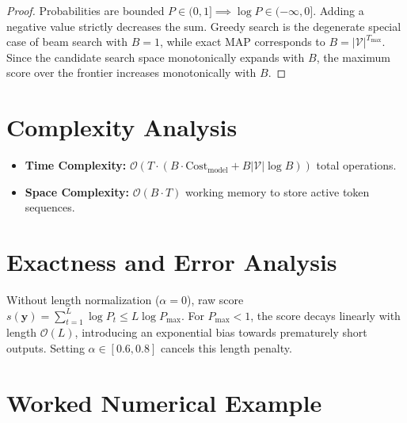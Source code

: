 \documentclass[11pt,a4paper]{article}
\theoremstyle{definition}
\begin{document}
\begin{proof}
Probabilities are bounded $P \in (0, 1] \implies \log P \in (-\infty, 0]$. Adding a negative value strictly decreases the sum. Greedy search is the degenerate special case of beam search with $B=1$, while exact MAP corresponds to $B = |\mathcal{V}|^{T_{\max}}$. Since the candidate search space monotonically expands with $B$, the maximum score over the frontier increases monotonically with $B$.
\end{proof}

\section{Complexity Analysis}

\begin{itemize}
    \item \textbf{Time Complexity:} $\mathcal{O}(T \cdot (B \cdot \text{Cost}_{\text{model}} + B |\mathcal{V}| \log B))$ total operations.
    \item \textbf{Space Complexity:} $\mathcal{O}(B \cdot T)$ working memory to store active token sequences.
\end{itemize}

\section{Exactness and Error Analysis}

Without length normalization ($\alpha = 0$), raw score $s(\mathbf{y}) = \sum_{t=1}^L \log P_t \le L \log P_{\max}$. For $P_{\max} < 1$, the score decays linearly with length $\mathcal{O}(L)$, introducing an exponential bias towards prematurely short outputs. Setting $\alpha \in [0.6, 0.8]$ cancels this length penalty.

\section{Worked Numerical Example}
\end{document}
